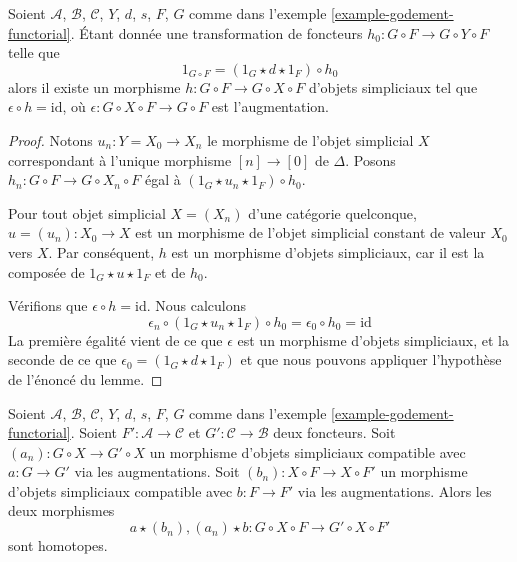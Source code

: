 \begin{lemma}
\label{lemma-godement-section}
Soient $\mathcal{A}$, $\mathcal{B}$, $\mathcal{C}$, $Y$, $d$, $s$, $F$, $G$
comme dans l'exemple \ref{example-godement-functorial}. Étant donnée une
transformation de foncteurs $h_0 : G \circ F \to G \circ Y \circ F$ telle que
$$
1_{G \circ F} = (1_G \star d \star 1_F) \circ h_0
$$
alors il existe un morphisme $h : G \circ F \to G \circ X \circ F$
d'objets simpliciaux tel que $\epsilon \circ h = \text{id}$, où
$\epsilon : G \circ X \circ F \to G \circ F$ est l'augmentation.
\end{lemma}

\begin{proof}
Notons $u_n : Y = X_0 \to X_n$ le morphisme de l'objet simplicial $X$
correspondant à l'unique morphisme $[n] \to [0]$ de $\Delta$.
Posons $h_n : G \circ F \to G \circ X_n \circ F$ égal à
$(1_G \star u_n \star 1_F) \circ h_0$.

\medskip\noindent
Pour tout objet simplicial $X = (X_n)$ d'une catégorie quelconque,
$u =(u_n) : X_0 \to X$ est un morphisme de l'objet simplicial constant de
valeur $X_0$ vers $X$. Par conséquent, $h$ est un morphisme d'objets
simpliciaux, car il est la composée de $1_G \star u \star 1_F$ et de $h_0$.

\medskip\noindent
Vérifions que $\epsilon \circ h = \text{id}$. Nous calculons
$$
\epsilon_n \circ (1_G \star u_n \star 1_F) \circ h_0 =
\epsilon_0 \circ h_0 = \text{id}
$$
La première égalité vient de ce que $\epsilon$ est un morphisme d'objets
simpliciaux, et la seconde de ce que
$\epsilon_0 = (1_G \star d \star 1_F)$ et que nous pouvons appliquer
l'hypothèse de l'énoncé du lemme.
\end{proof}

\begin{lemma}
\label{lemma-godement-two-maps}
Soient $\mathcal{A}$, $\mathcal{B}$, $\mathcal{C}$, $Y$, $d$, $s$, $F$, $G$
comme dans l'exemple \ref{example-godement-functorial}. Soient
$F' : \mathcal{A} \to \mathcal{C}$ et
$G' : \mathcal{C} \to \mathcal{B}$ deux foncteurs.
Soit $(a_n) : G \circ X \to G' \circ X$ un morphisme d'objets simpliciaux
compatible avec $a : G \to G'$ via les augmentations.
Soit $(b_n) : X \circ F \to X \circ F'$ un morphisme d'objets simpliciaux
compatible avec $b : F \to F'$ via les augmentations. Alors les deux morphismes
$$
a \star (b_n), (a_n) \star b : G \circ X \circ F \to G' \circ X \circ F'
$$
sont homotopes.
\end{lemma}

